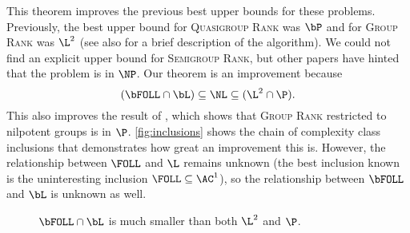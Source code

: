 \documentclass{article}
\begin{document}
This theorem improves the previous best upper bounds for these problems.
Previously, the best upper bound for \textsc{Quasigroup Rank} was $\bP$ \autocite[Section~5]{py96} and for \textsc{Group Rank} was $\L^2$ \autocite{lsz77} (see also \cite[Proposition~6]{at06} for a brief description of the algorithm).
We could not find an explicit upper bound for \textsc{Semigroup Rank}, but other papers have hinted that the problem is in $\NP$.
Our theorem is an improvement because
\begin{equation*}
  (\bFOLL \cap \bL) \subseteq \NL \subseteq (\L^2 \cap \P).
\end{equation*}
This also improves the result of \cite[Theorem~7]{at06}, which shows that \textsc{Group Rank} restricted to nilpotent groups is in $\P$.
\autoref{fig:inclusions} shows the chain of complexity class inclusions that demonstrates how great an improvement this is.
However, the relationship between $\FOLL$ and $\L$ remains unknown (the best inclusion known is the uninteresting inclusion $\FOLL \subseteq \AC^1$), so the relationship between $\bFOLL$ and $\bL$ is unknown as well.

\begin{figure}
  \caption{\label{fig:inclusions}$\bFOLL \cap \bL$ is much smaller than both $\L^2$ and $\P$.}
  \begin{center}
  \end{center}
\end{figure}

\end{document}
